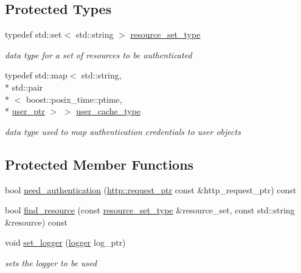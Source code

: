 \subsection*{Protected Types}
\begin{DoxyCompactItemize}
\item 
typedef std\-::set$<$ std\-::string $>$ \hyperlink{classpion_1_1http_1_1auth_afba7081a3795e3010f0051e4e85a38e3}{resource\-\_\-set\-\_\-type}
\begin{DoxyCompactList}\small\item\em data type for a set of resources to be authenticated \end{DoxyCompactList}\item 
typedef std\-::map$<$ std\-::string, \\*
std\-::pair\\*
$<$ boost\-::posix\-\_\-time\-::ptime, \\*
\hyperlink{namespacepion_afd2ae32f926db1286ba2e83011456e11}{user\-\_\-ptr} $>$ $>$ \hyperlink{classpion_1_1http_1_1auth_a57a2002495d45ac3ea508ee4186356b5}{user\-\_\-cache\-\_\-type}
\begin{DoxyCompactList}\small\item\em data type used to map authentication credentials to user objects \end{DoxyCompactList}\end{DoxyCompactItemize}
\subsection*{Protected Member Functions}
\begin{DoxyCompactItemize}
\item 
bool \hyperlink{classpion_1_1http_1_1auth_a62f9ddca03be608b7884542b0d6904f6}{need\-\_\-authentication} (\hyperlink{namespacepion_1_1http_ace432b70a9459d50ff4969a7a47f0ccb}{http\-::request\-\_\-ptr} const \&http\-\_\-request\-\_\-ptr) const 
\item 
bool \hyperlink{classpion_1_1http_1_1auth_a87046c8b7fe4b74b1b76704c2093f6a9}{find\-\_\-resource} (const \hyperlink{classpion_1_1http_1_1auth_afba7081a3795e3010f0051e4e85a38e3}{resource\-\_\-set\-\_\-type} \&resource\-\_\-set, const std\-::string \&resource) const 
\item 
void \hyperlink{classpion_1_1http_1_1auth_af25a5d74ab812554d6c04379c856d019}{set\-\_\-logger} (\hyperlink{structpion_1_1logger}{logger} log\-\_\-ptr)
\begin{DoxyCompactList}\small\item\em sets the logger to be used \end{DoxyCompactList}\end{DoxyCompactItemize}

